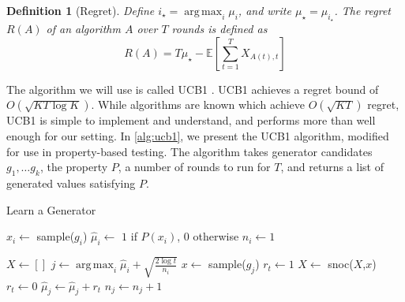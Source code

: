 \documentclass[sigconf,nonacm]{acmart}
\newtheorem{definition}{Definition}
\DeclareMathOperator*{\argmax}{arg\,max}
\begin{document}
\begin{definition}[Regret]
Define $i_\star = \argmax_i \mu_i$, and write $\mu_\star = \mu_{i_\star}$. The regret $R(A)$ of an algorithm $A$ over $T$ rounds is defined as
$$
R(A) = T\mu_\star - \mathbb{E}\left[\sum_{t=1}^T X_{A(t),t}\right]
$$
\end{definition}

The algorithm we will use is called UCB1 \cite{auer2002finite}. UCB1 achieves a regret bound of $O(\sqrt{KT\log K})$. While algorithms are known which achieve $O(\sqrt{KT})$ regret, UCB1 is simple to implement and understand, and performs more than well enough for our setting. In \autoref{alg:ucb1}, we present the UCB1 algorithm, modified for use in property-based testing. The algorithm takes generator candidates $g_1,\dots g_k$, the property $P$, a number of rounds to run for $T$, and returns a list of generated values satisfying $P$.

\begin{algorithm}
    \caption{Learn a Generator}
    \label{alg:ucb1}
    \begin{algorithmic}
      \State $x_i \gets $ sample($g_i$)
      \State $\hat{\mu}_i \gets$ $1$ if $P(x_i)$, $0$ otherwise
      \State $n_i \gets 1$

      \EndFor
      \State $X \gets []$
        \State $j \gets \argmax_i \hat{\mu}_i + \sqrt{\frac{2\log t}{n_i}}$
        \State $x \gets$ sample($g_j$)
          \State $r_t \gets 1$
          \State $X \gets$ snoc($X$,$x$)
        \Else
          \State $r_t \gets 0$
        \EndIf
        \State $\hat{\mu}_j \gets \hat{\mu}_j + r_t$
        \State $n_j \gets n_j + 1$
      \EndFor
      \EndFunction
    \end{algorithmic}
\end{algorithm}
\end{document}
